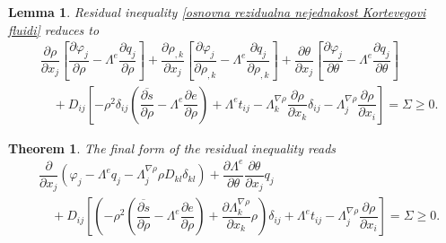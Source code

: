 \documentclass[10pt,a4paper]{amsart}
\newtheorem{lemma}{Lemma}
\newtheorem{theorem}{Theorem}
\begin{document}
\begin{lemma} \label{Lema:Rezidualna nejednakost 2}
	Residual inequality \eqref{osnovna rezidualna nejednakost Kortevegovi fluidi} reduces to
	\begin{align} \label{rezidualna nejednakost 2 Kortevegovi fluidi}
		& \dfrac{\partial\rho}{\partial x_j} \left[\dfrac{\partial\varphi_j}{\partial\rho} 
		- \Lambda^e\dfrac{\partial q_j}{\partial\rho}\right] 
		+ \dfrac{\partial\rho_{,k}}{\partial x_j} \left[\dfrac{\partial\varphi_j}{\partial\rho_{,k}} 
		- \Lambda^e\dfrac{\partial q_j}{\partial\rho_{,k}} \right] 
		+ \dfrac{\partial\theta}{\partial x _j} \left[ \dfrac{\partial\varphi_j}{\partial\theta} 
		- \Lambda^e \dfrac{\partial q_j}{\partial\theta} \right]  
		\\
		& \quad + D_{ij} \left[ -\rho^2\delta_{ij} \left(\overline{\dfrac{\partial s}{\partial\rho}} 
		- \Lambda^e \dfrac{\partial e}{\partial\rho}\right) + \Lambda^et_{ij} 
		- \Lambda^{\nabla\rho}_k\dfrac{\partial\rho}{\partial x_k}\delta_{ij} 
		- \Lambda^{\nabla\rho}_j\dfrac{\partial\rho}{\partial x_i} \right] = \Sigma \geq 0. 
		\nonumber 
	\end{align}
\end{lemma}

\begin{theorem}
	The final form of the residual inequality reads 
	\begin{align} \label{rezidualna nejednakost final Kortevegovi fluidi}
		& \dfrac{\partial}{\partial x_j} \left( \varphi_j - \Lambda^eq_j 
		- \Lambda^{\nabla\rho}_j \rho D_{kl}\delta_{kl}\right) 
		+ \dfrac{\partial\Lambda^e}{\partial\theta} \dfrac{\partial\theta}{\partial x_j}q_j 
		\\
		& \quad + D_{ij} \left[ \left( -\rho^2 \left( \overline{\dfrac{\partial s}{\partial\rho}} 
		- \Lambda^e \dfrac{\partial e}{\partial\rho} \right) 
		+ \dfrac{\partial\Lambda^{\nabla\rho}_k}{\partial x_k}\rho\right) \delta_{ij} 
		+ \Lambda^et_{ij} - \Lambda^{\nabla\rho}_j\dfrac{\partial\rho}{\partial x_i} \right]
		= \Sigma \geq 0. 
		\nonumber 
	\end{align}
\end{theorem}
\end{document}
